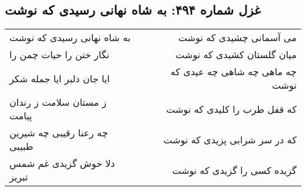 \begin{center}
\section*{غزل شماره ۴۹۴: به شاه نهانی رسیدی که نوشت}
\label{sec:0494}
\begin{longtable}{l p{0.5cm} r}
به شاه نهانی رسیدی که نوشت
&&
می آسمانی چشیدی که نوشت
\\
نگار ختن را حیات چمن را
&&
میان گلستان کشیدی که نوشت
\\
ایا جان دلبر ایا جمله شکر
&&
چه ماهی چه شاهی چه عیدی که نوشت
\\
ز مستان سلامت ز رندان پیامت
&&
که قفل طرب را کلیدی که نوشت
\\
چه رعنا رقیبی چه شیرین طبیبی
&&
که در سر شرابی پزیدی که نوشت
\\
دلا خوش گزیدی غم شمس تبریز
&&
گزیده کسی را گزیدی که نوشت
\\
\end{longtable}
\end{center}
